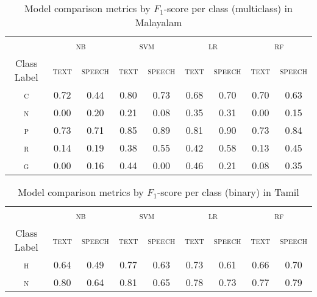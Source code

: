 \documentclass[11pt]{article}
\begin{document}
     \begin{table*}[]
        \caption{\label{tab:multiclass_malayalam} Model comparison metrics by $F_1$-score per class (multiclass) in Malayalam}
        \centering
        \begin{tabular}{ccccccccc}
            \hline
            \multicolumn{1}{c}{} & \multicolumn{2}{c}{\textsc{nb}} & \multicolumn{2}{c}{\textsc{svm}} & \multicolumn{2}{c}{\textsc{lr}} & \multicolumn{2}{c}{\textsc{rf}} \\
            Class Label & \textsc{text} & \textsc{speech} & \textsc{text} & \textsc{speech} & \textsc{text} & \textsc{speech} & \textsc{text} & \textsc{speech}  \\
            \hline
            \textsc{c} & 0.72 & 0.44 & 0.80 & 0.73 & 0.68 & 0.70 & 0.70 & 0.63 \\
            \textsc{n} & 0.00 & 0.20 & 0.21 & 0.08 & 0.35 & 0.31 & 0.00 & 0.15 \\
            \textsc{p} & 0.73 & 0.71 & 0.85 & 0.89 & 0.81 & 0.90 & 0.73 & 0.84 \\
            \textsc{r} & 0.14 & 0.19 & 0.38 & 0.55 & 0.42 & 0.58 & 0.13 & 0.45 \\
            \textsc{g} & 0.00 & 0.16 & 0.44 & 0.00 & 0.46 & 0.21 & 0.08 & 0.35 \\
            \hline
         \end{tabular}
     \end{table*}

     \begin{table*}[]
        \caption{\label{tab:binary_tamil} Model comparison metrics by $F_1$-score per class (binary) in Tamil}
        \centering
        \begin{tabular}{ccccccccc}
            \hline
            \multicolumn{1}{c}{} & \multicolumn{2}{c}{\textsc{nb}} & \multicolumn{2}{c}{\textsc{svm}} & \multicolumn{2}{c}{\textsc{lr}} & \multicolumn{2}{c}{\textsc{rf}} \\
            Class Label & \textsc{text} & \textsc{speech} & \textsc{text} & \textsc{speech} & \textsc{text} & \textsc{speech} & \textsc{text} & \textsc{speech}  \\
            \hline
            \textsc{h} & 0.64 & 0.49 & 0.77 & 0.63 & 0.73 & 0.61 & 0.66 & 0.70 \\
            \textsc{n} & 0.80 & 0.64 & 0.81 & 0.65 & 0.78 & 0.73 & 0.77 & 0.79 \\
            \hline
         \end{tabular}
     \end{table*} 
\end{document}
